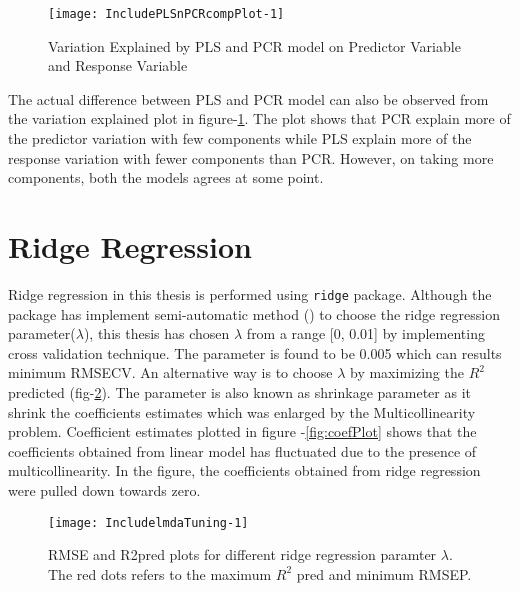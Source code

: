 \documentclass[12pt, lot, lof]{thesis}\usepackage[]{graphicx}\usepackage[]{color}
\makeatletter
\def\maxwidth{ %
  \ifdim\Gin@nat@width>\linewidth
    \linewidth
  \else
    \Gin@nat@width
  \fi
}
\makeatother
\begin{document}
\begin{Schunk}
\begin{figure}[!htpb]

{\centering \texttt{[image: IncludePLSnPCRcompPlot-1]} 

}

\caption[Variation Explained by PLS and PCR]{Variation Explained by PLS and PCR model on Predictor Variable and Response Variable\label{fig:PLSnPCRcompPlot}}
\end{figure}
\end{Schunk}
The actual difference between PLS and PCR model can also be observed from the variation explained plot in figure-\ref{fig:PLSnPCRcompPlot}. The plot shows that PCR explain more of the predictor variation with few components while PLS explain more of the response variation with fewer components than PCR. However, on taking more components, both the models agrees at some point.

\section{Ridge Regression}
\label{sec:ridgeReg}

Ridge regression in this thesis is performed using \texttt{ridge} package. Although the package has implement semi-automatic method (\cite{cule2012semi}) to choose the ridge regression parameter($\lambda$), this thesis has chosen $\lambda$ from a range [0, 0.01] by implementing cross validation technique. The parameter is found to be 0.005 which can results minimum RMSECV. An alternative way is to choose $\lambda$ by maximizing the $R^2$ predicted (fig-\ref{fig:lmdaTuning}). The parameter is also known as shrinkage parameter as it shrink the coefficients estimates which was enlarged by the Multicollinearity problem. Coefficient estimates plotted in figure -\ref{fig:coefPlot} shows that the coefficients obtained from linear model has fluctuated due to the presence of multicollinearity. In the figure, the coefficients obtained from ridge regression were pulled down towards zero.


\begin{Schunk}
\begin{figure}[htbp]

{\centering \texttt{[image: IncludelmdaTuning-1]} 

}

\caption[RMSE and R2pred plots for different ridge regression paramter ]{RMSE and R2pred plots for different ridge regression paramter $\lambda$. The red dots refers to the maximum $R^2$ pred and minimum RMSEP.\label{fig:lmdaTuning}}
\end{figure}
\end{Schunk}
  
\end{document}

